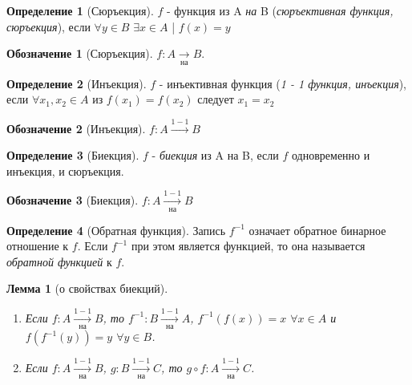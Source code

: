 \documentclass[a4paper]{article}
\newtheorem*{lemma*}{Лемма}
\theoremstyle{definition}
\newtheorem*{definition*}{Определение}
\newtheorem*{name}{Обозначение}
\begin{document}
\begin{enumerate}
\begin{definition*}[Сюръекция]
        $f$ - функция из A \textit{на} B (\textit{сюръективная функция, сюръекция}), если $\forall y \in B$ $\exists x \in A$ | $f(x) = y$
       \end{definition*}
       \begin{name}[Сюръекция]
        $f: A\xrightarrow[\textit{на}]{}B$.
       \end{name}
       \begin{definition*}[Инъекция]
        $f$ - инъективная функция (\textit{1 - 1 функция, инъекция}), если $\forall x_{1}, x_{2}\in A $ из $f(x_{1}) = f(x_{2})$ следует $x_{1} = x_{2}$
       \end{definition*}
       \begin{name}[Инъекция]
        $f: A \xrightarrow{1-1} B$
       \end{name}
       \begin{definition*}[Биекция]
        $f$ - \textit{биекция} из A на B, если $f$ одновременно и инъекция, и сюръекция.
       \end{definition*}
       \begin{name}[Биекция]
        $f: A \xrightarrow[\textit{на}]{1-1} B$
       \end{name}
       \begin{definition*}[Обратная функция]
        Запись $f^{-1}$ означает обратное бинарное отношение к $f$. Если $f^{-1}$ при этом является функцией, то она называется \textit{обратной функцией} к $f$.
       \end{definition*}

       \begin{lemma*}[о свойствах биекций]\mbox{}\\
        \begin{enumerate}
         \item Если $f: A \xrightarrow[\textit{на}]{1-1} B$, то $f^{-1}: B \xrightarrow[\textit{на}]{1-1} A$, $f^{-1}(f(x)) = x$ $\forall x \in A$ и $f(f^{-1}(y)) = y$ $\forall y \in B$.
         \item Если $f: A \xrightarrow[\textit{на}]{1-1} B$, $g: B \xrightarrow[\textit{на}]{1-1} C$, то $g \circ f:  A \xrightarrow[\textit{на}]{1-1} C$.
        \end{enumerate}
       \end{lemma*}



\end{enumerate}
\end{document}

